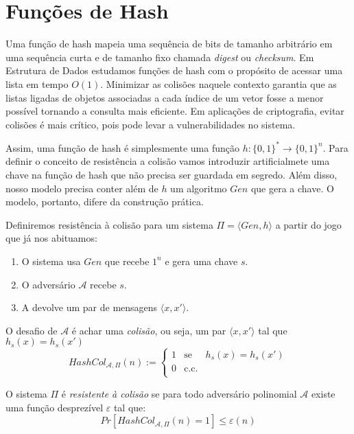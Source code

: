 \chapter{Funções de Hash}
\label{cha:hash}

Uma função de hash mapeia uma sequência de bits de tamanho arbitrário em uma sequência curta e de tamanho fixo chamada {\em digest} ou {\em checksum}.
Em Estrutura de Dados estudamos funções de hash com o propósito de acessar uma lista em tempo $O(1)$.
Minimizar as colisões naquele contexto garantia que as listas ligadas de objetos associadas a cada índice de um vetor fosse a menor possível tornando a consulta mais eficiente.
Em aplicações de criptografia, evitar colisões é mais crítico, pois pode levar a vulnerabilidades no sistema.

Assim, uma função de hash é simplesmente uma função $h: \{0,1\}^* \to \{0,1\}^n$.
Para definir o conceito de resistência a colisão vamos introduzir artificialmete uma chave na função de hash que não precisa ser guardada em segredo.
Além disso, nosso modelo precisa conter além de $h$ um algoritmo $Gen$ que gera a chave.
O modelo, portanto, difere da construção prática.

Definiremos resistência à colisão para um sistema $\Pi = \langle Gen, h \rangle$ a partir do jogo que já nos abituamos:
\begin{enumerate}
\item O sistema usa $Gen$ que recebe $1^n$ e gera uma chave $s$.
\item O adversário $\mathcal{A}$ recebe $s$.
\item A devolve um par de mensagens $\langle x, x' \rangle$.
\end{enumerate}

O desafio de $\mathcal{A}$ é achar uma {\em colisão}, ou seja, um par $\langle x, x' \rangle$ tal que $h_s(x) = h_s(x')$
\begin{displaymath}
  HashCol_{\mathcal{A}, \Pi}(n) := \left\{
    \begin{array}{lcl}
      1 & \textrm{se} & h_s(x) = h_s(x')\\
      0 & \textrm{c.c.} &\\
    \end{array}
    \right.
\end{displaymath}

O sistema $\Pi$ é {\em resistente à colisão} se para todo adversário polinomial $\mathcal{A}$ existe uma função desprezível $\varepsilon$ tal que:
\begin{displaymath}
  Pr[HashCol_{\mathcal{A}, \Pi}(n) = 1] \leq \varepsilon(n)
\end{displaymath}

